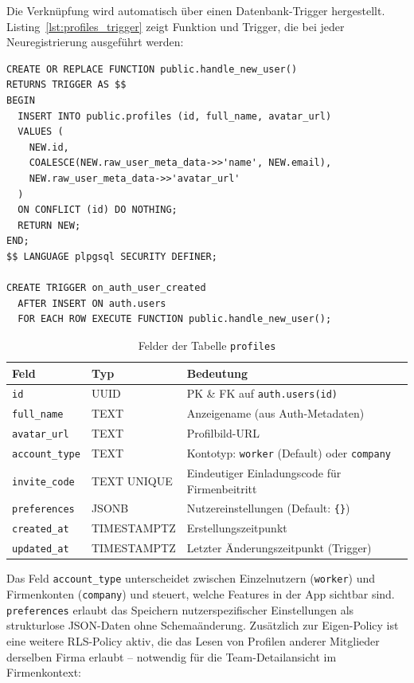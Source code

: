 Die Verknüpfung wird automatisch über einen Datenbank-Trigger hergestellt.
Listing~\ref{lst:profiles_trigger} zeigt Funktion und Trigger, die bei jeder
Neuregistrierung ausgeführt werden:

\begin{lstlisting}[style=skyline-sql,
  caption={Automatische Profilanlage via Trigger (complete\_working\_schema.sql)},
  label={lst:profiles_trigger}]
CREATE OR REPLACE FUNCTION public.handle_new_user()
RETURNS TRIGGER AS $$
BEGIN
  INSERT INTO public.profiles (id, full_name, avatar_url)
  VALUES (
    NEW.id,
    COALESCE(NEW.raw_user_meta_data->>'name', NEW.email),
    NEW.raw_user_meta_data->>'avatar_url'
  )
  ON CONFLICT (id) DO NOTHING;
  RETURN NEW;
END;
$$ LANGUAGE plpgsql SECURITY DEFINER;

CREATE TRIGGER on_auth_user_created
  AFTER INSERT ON auth.users
  FOR EACH ROW EXECUTE FUNCTION public.handle_new_user();
\end{lstlisting}

\begin{table}[H]
  \centering
  \caption{Felder der Tabelle \texttt{profiles}}
  \label{tab:profiles_felder}
  \begin{tabularx}{\textwidth}{l l X}
    \toprule
    \textbf{Feld} & \textbf{Typ} & \textbf{Bedeutung} \\
    \midrule
    \texttt{id}            & UUID        & PK \& FK auf \texttt{auth.users(id)} \\
    \texttt{full\_name}    & TEXT        & Anzeigename (aus Auth-Metadaten) \\
    \texttt{avatar\_url}   & TEXT        & Profilbild-URL \\
    \texttt{account\_type} & TEXT        & Kontotyp: \texttt{worker} (Default) oder \texttt{company} \\
    \texttt{invite\_code}  & TEXT UNIQUE & Eindeutiger Einladungscode für Firmenbeitritt \\
    \texttt{preferences}   & JSONB       & Nutzereinstellungen (Default: \texttt{\{\}}) \\
    \texttt{created\_at}   & TIMESTAMPTZ & Erstellungszeitpunkt \\
    \texttt{updated\_at}   & TIMESTAMPTZ & Letzter Änderungszeitpunkt (Trigger) \\
    \bottomrule
  \end{tabularx}
\end{table}

Das Feld \texttt{account\_type} unterscheidet zwischen Einzelnutzern
(\texttt{worker}) und Firmenkonten (\texttt{company}) und steuert,
welche Features in der App sichtbar sind.
\texttt{preferences} erlaubt das Speichern nutzerspezifischer Einstellungen
als strukturlose JSON-Daten ohne Schemaänderung.
Zusätzlich zur Eigen-Policy ist eine weitere RLS-Policy aktiv, die das Lesen
von Profilen anderer Mitglieder derselben Firma erlaubt -- notwendig für die
Team-Detailansicht im Firmenkontext:

